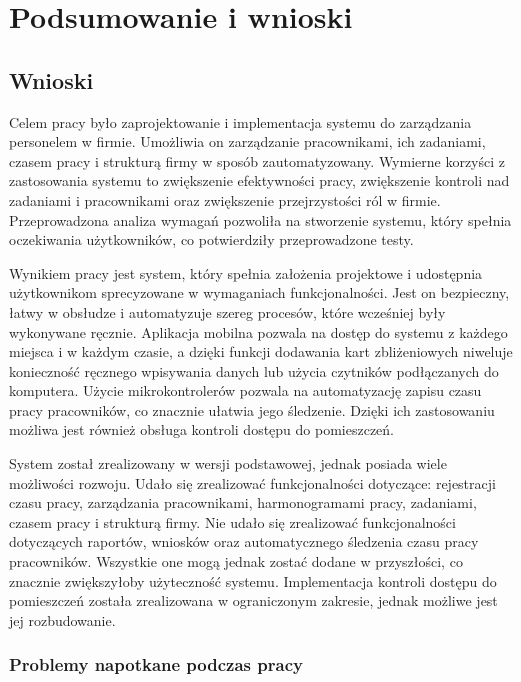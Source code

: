 \chapter{Podsumowanie i wnioski}

\section{Wnioski}

Celem pracy było zaprojektowanie i implementacja systemu do zarządzania personelem w firmie. Umożliwia on zarządzanie pracownikami, ich zadaniami, czasem pracy i strukturą firmy w sposób zautomatyzowany. Wymierne korzyści z zastosowania systemu to zwiększenie efektywności pracy, zwiększenie kontroli nad zadaniami i pracownikami oraz zwiększenie przejrzystości ról w firmie. Przeprowadzona analiza wymagań pozwoliła na stworzenie systemu, który spełnia oczekiwania użytkowników, co potwierdziły przeprowadzone testy.

Wynikiem pracy jest system, który spełnia założenia projektowe i udostępnia użytkownikom sprecyzowane w wymaganiach funkcjonalności. Jest on bezpieczny, łatwy w obsłudze i automatyzuje szereg procesów, które wcześniej były wykonywane ręcznie. Aplikacja mobilna pozwala na dostęp do systemu z każdego miejsca i w każdym czasie, a dzięki funkcji dodawania kart zbliżeniowych niweluje konieczność ręcznego wpisywania danych lub użycia czytników podłączanych do komputera. Użycie mikrokontrolerów pozwala na automatyzację zapisu czasu pracy pracowników, co znacznie ułatwia jego śledzenie. Dzięki ich zastosowaniu możliwa jest również obsługa kontroli dostępu do pomieszczeń.

System został zrealizowany w wersji podstawowej, jednak posiada wiele możliwości rozwoju. Udało się zrealizować funkcjonalności dotyczące: rejestracji czasu pracy, zarządzania pracownikami, harmonogramami pracy, zadaniami, czasem pracy i strukturą firmy. Nie udało się zrealizować funkcjonalności dotyczących raportów, wniosków oraz automatycznego śledzenia czasu pracy pracowników. Wszystkie one mogą jednak zostać dodane w przyszłości, co znacznie zwiększyłoby użyteczność systemu. Implementacja kontroli dostępu do pomieszczeń została zrealizowana w ograniczonym zakresie, jednak możliwe jest jej rozbudowanie.

\subsection{Problemy napotkane podczas pracy}

